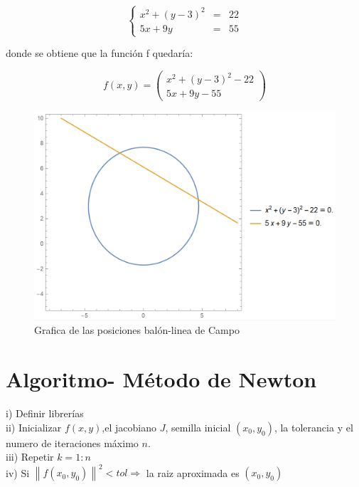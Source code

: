 \documentclass[10pt,a4paper]{article}
\begin{document}
$$\left\{\begin{matrix}
x^{2}+(y-3)^{2} & = & 22\\ 
5x+9y & = & 55
\end{matrix}\right.$$

donde se obtiene que la función f quedaría: 

$$f(x,y)=\begin{pmatrix}
 x^{2}+(y-3)^{2}-22\\ 
5x+9y-55
\end{pmatrix}$$

\begin{figure}[h]
\centering
\includegraphics[scale=0.4]{pelota2}
\caption{Grafica de las posiciones balón-linea de Campo}
\label{fig:graficafun}
\end{figure}




\section{Algoritmo- Método de Newton}


i) Definir librerías\\ 

ii) Inicializar $f(x,y)$,el jacobiano $J$, semilla inicial $(x_{0},y_{0})$, la tolerancia y el numero de iteraciones máximo $n$.\\
 
iii) Repetir $k=1:n$\\

\hspace{1cm} iv) Si $\left \| f(x_{0},y_{0}) \right \|^2<tol \Rightarrow$ la raiz aproximada es $(x_{0},y_{0})$ \\
\end{document}
